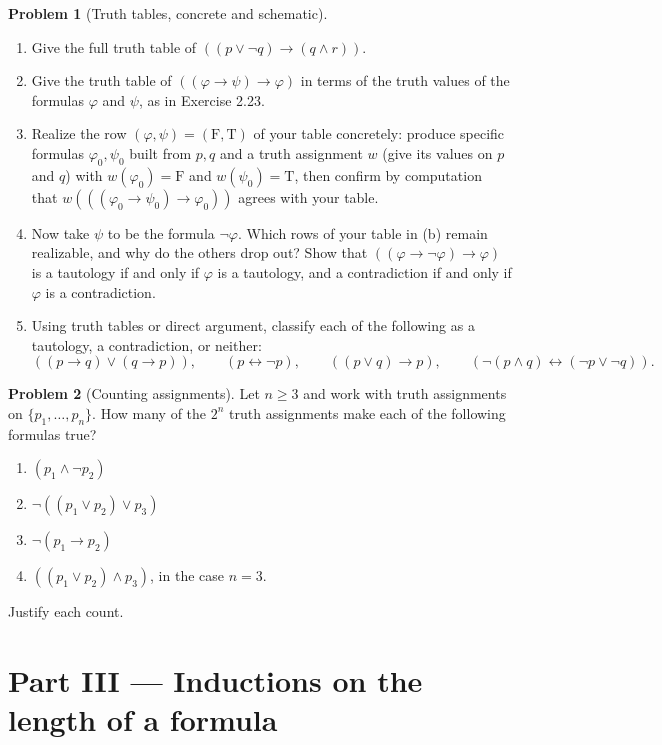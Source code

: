 \documentclass[11pt]{article}
\newcommand{\T}{\mathrm{T}}
\newcommand{\F}{\mathrm{F}}
\theoremstyle{definition}
\newtheorem{problem}{Problem}
\begin{document}
\begin{problem}[Truth tables, concrete and schematic]
\begin{enumerate}
\item[(a)] Give the full truth table of $((p\lor\lnot q)\to(q\land r))$.
\item[(b)] Give the truth table of $((\varphi\to\psi)\to\varphi)$ in terms of
the truth values of the formulas $\varphi$ and $\psi$, as in Exercise 2.23.
\item[(c)] Realize the row $(\varphi,\psi)=(\F,\T)$ of your table concretely:
produce specific formulas $\varphi_0,\psi_0$ built from $p,q$ and a truth
assignment $w$ (give its values on $p$ and $q$) with $w(\varphi_0)=\F$ and
$w(\psi_0)=\T$, then confirm by computation that
$w(((\varphi_0\to\psi_0)\to\varphi_0))$ agrees with your table.
\item[(d)] Now take $\psi$ to be the formula $\lnot\varphi$. Which rows of your
table in (b) remain realizable, and why do the others drop out? Show that
$((\varphi\to\lnot\varphi)\to\varphi)$ is a tautology if and only if $\varphi$
is a tautology, and a contradiction if and only if $\varphi$ is a contradiction.
\item[(e)] Using truth tables or direct argument, classify each of the following
as a tautology, a contradiction, or neither:
\[
((p\to q)\lor(q\to p)),\qquad
(p\leftrightarrow\lnot p),\qquad
((p\lor q)\to p),\qquad
(\lnot(p\land q)\leftrightarrow(\lnot p\lor\lnot q)).
\]
\end{enumerate}
\end{problem}

\begin{problem}[Counting assignments]
Let $n\ge 3$ and work with truth assignments on $\{p_1,\dots,p_n\}$. How many of
the $2^n$ truth assignments make each of the following formulas true?
\begin{enumerate}
\item[(a)] $(p_1\land\lnot p_2)$
\item[(b)] $\lnot((p_1\lor p_2)\lor p_3)$
\item[(c)] $\lnot(p_1\to p_2)$
\item[(d)] $((p_1\lor p_2)\land p_3)$, in the case $n=3$.
\end{enumerate}
Justify each count.
\end{problem}

\section*{Part III --- Inductions on the length of a formula}
\end{document}
